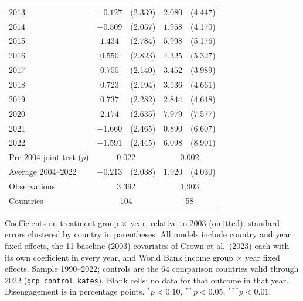 \begin{table}[htbp]
\begin{tabular}{lcccc}
2013 & $-0.127$ & (2.339) & $2.080$ & (4.447) \\
2014 & $-0.509$ & (2.057) & $1.958$ & (4.170) \\
2015 & $1.434$ & (2.784) & $5.998$ & (5.176) \\
2016 & $0.550$ & (2.823) & $4.325$ & (5.327) \\
2017 & $0.755$ & (2.140) & $3.452$ & (3.989) \\
2018 & $0.723$ & (2.194) & $3.136$ & (4.661) \\
2019 & $0.737$ & (2.282) & $2.844$ & (4.648) \\
2020 & $2.174$ & (2.635) & $7.979$ & (7.577) \\
2021 & $-1.660$ & (2.465) & $0.890$ & (6.607) \\
2022 & $-1.591$ & (2.445) & $6.098$ & (8.901) \\
\midrule
Pre-2004 joint test ($p$) & \multicolumn{2}{c}{0.022} & \multicolumn{2}{c}{0.002} \\
Average 2004--2022 & $-0.213$ & (2.038) & $1.920$ & (4.030) \\
Observations & \multicolumn{2}{c}{3,392} & \multicolumn{2}{c}{1,903} \\
Countries & \multicolumn{2}{c}{104} & \multicolumn{2}{c}{58} \\
\bottomrule
\end{tabular}
\par\vspace{4pt}
\begin{minipage}{\textwidth}\footnotesize Coefficients on treatment group $\times$ year, relative to 2003 (omitted); standard errors clustered by country in parentheses. All models include country and year fixed effects, the 11 baseline (2003) covariates of Crown et al.\ (2023) each with its own coefficient in every year, and World Bank income group $\times$ year fixed effects. Sample 1990--2022; controls are the 64 comparison countries valid through 2022 (\texttt{grp\_control\_kates}). Blank cells: no data for that outcome in that year. Disengagement is in percentage points. $^{*}p<0.10$, $^{**}p<0.05$, $^{***}p<0.01$.\end{minipage}
\end{table}
